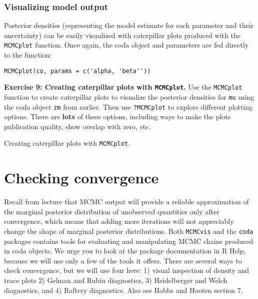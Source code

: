 \documentclass[12pt,english]{article}
\begin{document}
\subsubsection{Visualizing model output}

Posterior densities (representing the model estimate for each parameter and their uncertainty) can be easily visualized with caterpillar plots produced with the \texttt{MCMCplot} function. Once again, the coda object and parameters are fed directly to the function:

\begin{Verbatim}
MCMCplot(co, params = c('alpha, 'beta''))
\end{Verbatim}

\belowcaptionskip=-40pt
\begin{exercise}
\begin{mdframed}
\doublespacing
\textbf{Exercise 9: Creating caterpillar plots with \texttt{MCMCplot}.} Use the \texttt{MCMCplot} function to create caterpillar plots to visualize the posterior densities for \texttt{mu} using the coda object \texttt{zm} from earlier.  Then use \texttt{?MCMCplot} to explore different plotting options.  There are \textbf{lots} of these options, including ways to make the plots publication quality, show overlap with zero, etc.
\end{mdframed}
\captionsetup{textformat=empty, labelformat=empty}
\caption[Creating caterpillar plots with \texttt{MCMCplot}]{Creating caterpillar plots with \texttt{MCMCplot}.}
\label{ex:caterpillar plots MCMCplot}
\end{exercise}
\belowcaptionskip=0pt

\section{Checking convergence}

Recall from lecture that MCMC output will provide a reliable approximation of the marginal posterior distribution of unobserved quantities only after convergence, which means that adding more iterations will not appreciably change the shape of  marginal posterior distributions. Both \texttt{MCMCvis} and the \texttt{coda} packages contains tools for evaluating and manipulating MCMC chains produced in coda objects. We urge you to look at the package documentation in R Help, because we will use only a few of the tools it offers. There are several ways to check convergence, but we will use four here: 1) visual inspection of density and trace plots 2) Gelman and Rubin diagnostics, 3) Heidelberger and Welch diagnostics, and 4) Raftery diagnostics. Also see Hobbs and Hooten \citeyearpar{hobbs2015bayesian} section 7.
\end{document}
